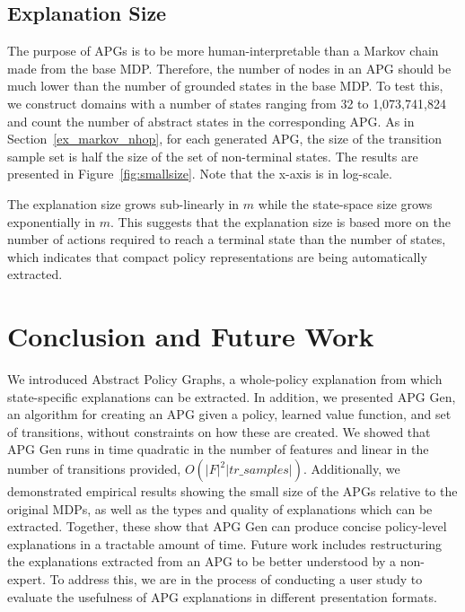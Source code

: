 \documentclass[letterpaper]{article} %
\begin{document}
\subsection{Explanation Size}
The purpose of APGs is to be more human-interpretable than a Markov chain made from the base MDP. 
Therefore, the number of nodes in an APG should be much lower than the number of grounded states in the base MDP. 
To test this, we construct domains with a number of states ranging from 32 to 1,073,741,824 and count the number of abstract states in the corresponding APG. 
As in Section~\ref{ex_markov_nhop}, for each generated APG, the size of the transition sample set is half the size of the set of non-terminal states. 
The results are presented in Figure~\ref{fig:smallsize}. 
Note that the x-axis is in log-scale. 

The explanation size grows sub-linearly in $m$ while the state-space size grows exponentially in $m$. 
This suggests that the explanation size is based more on the number of actions required to reach a terminal state than the number of states, which indicates that compact policy representations are being automatically extracted. 

\section{Conclusion and Future Work}
We introduced Abstract Policy Graphs, a whole-policy explanation from which state-specific explanations can be extracted. In addition, we presented APG Gen, an algorithm for creating an APG given a policy, learned value function, and set of transitions, without constraints on how these are created. We showed that APG Gen runs in time quadratic in the number of features and linear in the number of transitions provided, $O(|F|^2 |tr\_samples|)$. Additionally, we demonstrated empirical results showing the small size of the APGs relative to the original MDPs, as well as the types and quality of explanations which can be extracted. Together, these show that APG Gen can produce concise policy-level explanations in a tractable amount of time. 
Future work includes restructuring the explanations extracted from an APG to be better understood by a non-expert.
To address this, we are in the process of conducting a user study to evaluate the usefulness of APG explanations in different presentation formats. 
\end{document}
